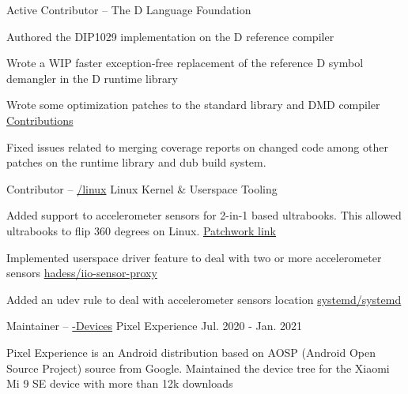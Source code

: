 \begin{cventries}
  \cventry
    {Active Contributor --
    \href{https://github.com/dlang}{\faGithubSquare\acvHeaderIconSep\@dlang}} %
    {The D Language Foundation} %
    {} %
    {} %
    {
      \begin{cvitems} %
        \item {Authored the DIP1029 implementation on the D reference compiler}
        \item {Wrote a WIP faster exception-free replacement of the reference D symbol demangler in the D runtime library}
        \item {Wrote some optimization patches to the standard library and DMD compiler \hfill
        \href{https://github.com/pulls?q=is\%3Apr+author\%3Aljmf00+is\%3Aclosed+org\%3Adlang+}{Contributions \acvHeaderIconSep\@\faGithubSquare}}
        \item {Fixed issues related to merging coverage reports on changed code among other patches on the runtime library and dub build system.}
      \end{cvitems}
    }

  \cventry
    {Contributor -- \href{https://github.com/torvalds/linux/}{\faGithubSquare\acvHeaderIconSep\@torvalds/linux}} %
    {Linux Kernel \scriptsize \& Userspace Tooling} %
    {} %
    {} %
    {
      \begin{cvitems} %
        \item {Added support to accelerometer sensors for 2-in-1 based ultrabooks. This allowed ultrabooks to flip 360 degrees on Linux. \hfill \href{https://patchwork.kernel.org/patch/10882031/}{Patchwork link}}
        \item {Implemented userspace driver feature to deal with two or more accelerometer sensors \hfill \href{https://github.com/hadess/iio-sensor-proxy/pull/262}{hadess/iio-sensor-proxy\acvHeaderIconSep\@\faGithubSquare}}
        \item{Added an udev rule to deal with accelerometer sensors location \hfill \href{https://github.com/systemd/systemd/pull/12322/}{systemd/systemd\acvHeaderIconSep\@\faGithubSquare}}
      \end{cvitems}
    }

  \cventry
    {Maintainer --
    \href{https://github.com/PixelExperience-Devices}{\faGithubSquare\acvHeaderIconSep\@PixelExperience-Devices}} %
    {Pixel Experience} %
    {} %
    {Jul. 2020 - Jan. 2021} %
    {
      \begin{cvitems} %
        \item {Pixel Experience is an Android distribution based on AOSP (Android Open Source Project) source from Google. Maintained the device tree for the Xiaomi Mi 9 SE device with more than 12k downloads}
      \end{cvitems}
    }


\end{cventries}
